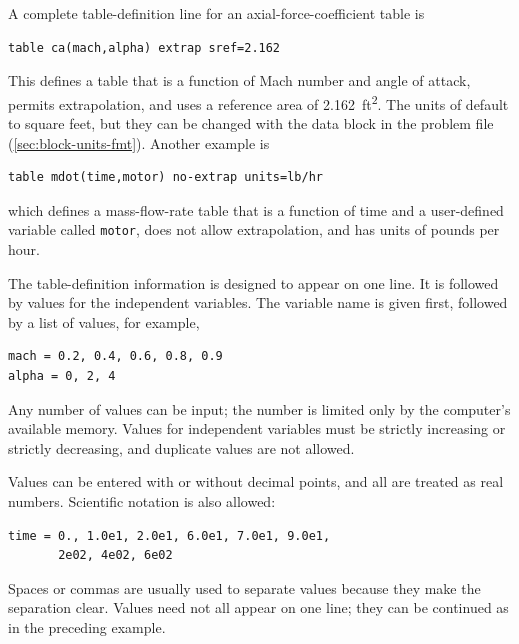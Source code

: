
A complete table-definition line for an axial-force-coefficient table is

\begin{lstlisting}[style=taosmanual]
table ca(mach,alpha) extrap sref=2.162
\end{lstlisting}

This defines a table that is a function of Mach number and angle of attack, permits
extrapolation, and uses a reference area of 2.162~ft\textsuperscript{2}. The units of
 default to square feet, but they can be changed with the
 data block in the problem file
(\cref{sec:block-units-fmt}). Another example is

\begin{lstlisting}[style=taosmanual]
table mdot(time,motor) no-extrap units=lb/hr
\end{lstlisting}

which defines a mass-flow-rate table that is a function of time and a user-defined
variable called \texttt{motor}, does not allow extrapolation, and has units of
pounds per hour.


The table-definition information is designed to appear on one line. It is followed by
values for the independent variables. The variable name is given first, followed by a
list of values, for example,

\begin{lstlisting}[style=taosmanual]
mach = 0.2, 0.4, 0.6, 0.8, 0.9
alpha = 0, 2, 4
\end{lstlisting}

Any number of values can be input; the number is limited only by the computer's
available memory. Values for independent variables must be strictly increasing or
strictly decreasing, and duplicate values are not allowed.

Values can be entered with or without decimal points, and all are treated as real
numbers. Scientific notation is also allowed:

\begin{lstlisting}[style=taosmanual]
time = 0., 1.0e1, 2.0e1, 6.0e1, 7.0e1, 9.0e1,
       2e02, 4e02, 6e02
\end{lstlisting}

Spaces or commas are usually used to separate values because they make the
separation clear. Values need not all appear on one line; they can be continued as in
the preceding example.

